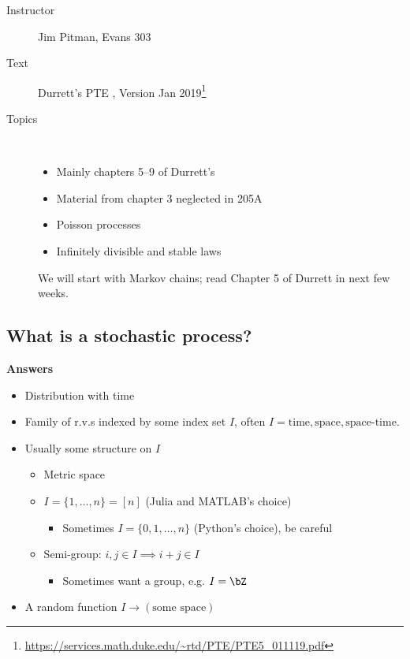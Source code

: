 
\begin{description}
  \item[Instructor] Jim Pitman, Evans 303
  \item[Text] Durrett's PTE \citep{durrett2019probability}, Version Jan 2019\footnote{\url{https://services.math.duke.edu/~rtd/PTE/PTE5_011119.pdf}}
  \item[Topics]~
    \begin{itemize}
      \item Mainly chapters 5--9 of Durrett's
      \item Material from chapter 3 neglected in 205A
      \item Poisson processes
      \item Infinitely divisible and stable laws
    \end{itemize}
    We will start with Markov chains; read Chapter 5 of Durrett in
    next few weeks.
\end{description}


\subsection{What is a stochastic process?}

\textbf{Answers}

\begin{itemize}
  \item Distribution with time
  \item Family of r.v.s indexed by some index set $I$, often
    $I = \text{time}, \text{space}, \text{space-time}$.
  \item Usually some structure on $I$
    \begin{itemize}
      \item Metric space
      \item $I = \{1,\ldots,n\} = [n]$ (Julia and MATLAB's choice)
        \begin{itemize}
          \item Sometimes $I = \{0, 1,\ldots,n\}$ (Python's choice), be careful
        \end{itemize}
      \item Semi-group: $i,j \in I \implies i+j \in I$
        \begin{itemize}
          \item Sometimes want a group, e.g. $I = \bZ$
        \end{itemize}
    \end{itemize}
  \item A random function $I \to (\text{some space})$
\end{itemize}

